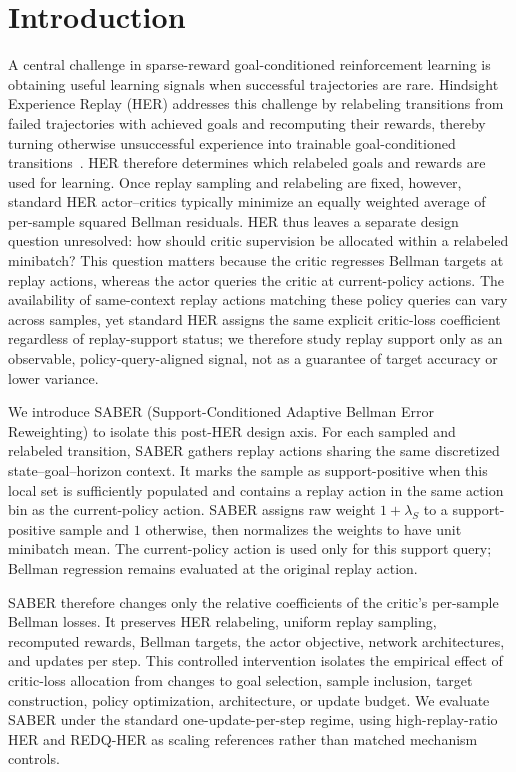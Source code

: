 \documentclass[letterpaper]{article}
\begin{document}
\section{Introduction}

A central challenge in sparse-reward goal-conditioned reinforcement learning is obtaining useful learning signals when successful trajectories are rare. Hindsight Experience Replay (HER) addresses this challenge by relabeling transitions from failed trajectories with achieved goals and recomputing their rewards, thereby turning otherwise unsuccessful experience into trainable goal-conditioned transitions~\citep{andrychowicz2017her}. HER therefore determines which relabeled goals and rewards are used for learning. Once replay sampling and relabeling are fixed, however, standard HER actor--critics typically minimize an equally weighted average of per-sample squared Bellman residuals. HER thus leaves a separate design question unresolved: how should critic supervision be allocated within a relabeled minibatch? This question matters because the critic regresses Bellman targets at replay actions, whereas the actor queries the critic at current-policy actions. The availability of same-context replay actions matching these policy queries can vary across samples, yet standard HER assigns the same explicit critic-loss coefficient regardless of replay-support status; we therefore study replay support only as an observable, policy-query-aligned signal, not as a guarantee of target accuracy or lower variance.

We introduce SABER (Support-Conditioned Adaptive Bellman Error Reweighting) to isolate this post-HER design axis. For each sampled and relabeled transition, SABER gathers replay actions sharing the same discretized state--goal--horizon context. It marks the sample as support-positive when this local set is sufficiently populated and contains a replay action in the same action bin as the current-policy action. SABER assigns raw weight \(1+\lambda_S\) to a support-positive sample and \(1\) otherwise, then normalizes the weights to have unit minibatch mean. The current-policy action is used only for this support query; Bellman regression remains evaluated at the original replay action.

SABER therefore changes only the relative coefficients of the critic's per-sample Bellman losses. It preserves HER relabeling, uniform replay sampling, recomputed rewards, Bellman targets, the actor objective, network architectures, and updates per step. This controlled intervention isolates the empirical effect of critic-loss allocation from changes to goal selection, sample inclusion, target construction, policy optimization, architecture, or update budget. We evaluate SABER under the standard one-update-per-step regime, using high-replay-ratio HER and REDQ-HER as scaling references rather than matched mechanism controls.
\end{document}
